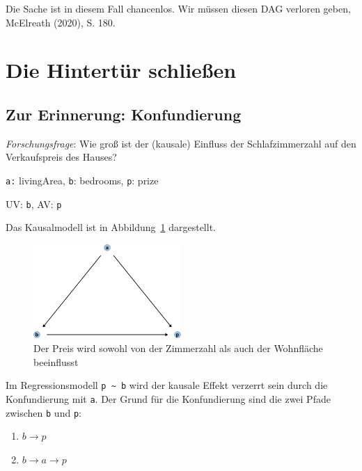\documentclass[
  a4paper,
  DIV=11]{scrreprt}
\providecommand{\tightlist}{%
  \setlength{\itemsep}{0pt}\setlength{\parskip}{0pt}}\usepackage{longtable,booktabs,array}
\theoremstyle{definition}
\theoremstyle{remark}
\begin{document}
Die Sache ist in diesem Fall chancenlos. Wir müssen diesen DAG verloren
geben, McElreath (2020), S. 180.

\hypertarget{die-hintertuxfcr-schlieuxdfen}{%
\section{Die Hintertür schließen}\label{die-hintertuxfcr-schlieuxdfen}}

\hypertarget{zur-erinnerung-konfundierung}{%
\subsection{Zur Erinnerung:
Konfundierung}\label{zur-erinnerung-konfundierung}}

\emph{Forschungsfrage}: Wie groß ist der (kausale) Einfluss der
Schlafzimmerzahl auf den Verkaufspreis des Hauses?

\texttt{a:} livingArea, \texttt{b}: bedrooms, \texttt{p}: prize

UV: \texttt{b}, AV: \texttt{p}

Das Kausalmodell ist in Abbildung~\ref{fig-dag-don1} dargestellt.

\begin{figure}

{\centering \includegraphics[width=0.5\textwidth,height=\textheight]{./kausal_files/figure-pdf/fig-dag-don1-1.pdf}

}

\caption{\label{fig-dag-don1}Der Preis wird sowohl von der Zimmerzahl
als auch der Wohnfläche beeinflusst}

\end{figure}

Im Regressionsmodell \texttt{p\ \textasciitilde{}\ b} wird der kausale
Effekt verzerrt sein durch die Konfundierung mit \texttt{a}. Der Grund
für die Konfundierung sind die zwei Pfade zwischen \texttt{b} und
\texttt{p}:

\begin{enumerate}
\def\labelenumi{\arabic{enumi}.}
\tightlist
\item
  \(b \rightarrow p\)
\item
  \(b \rightarrow a \rightarrow p\)
\end{enumerate}
\end{document}
